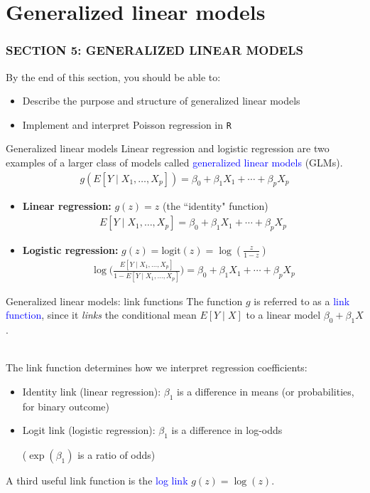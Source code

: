 \documentclass[10pt,t]{beamer}
\begin{document}
\section{Generalized linear models}
\begin{frame}
	\frametitle{SECTION 5: GENERALIZED LINEAR MODELS}
	By the end of this section, you should be able to:
	\begin{itemize}
		\item Describe the purpose and structure of generalized linear models
		\item Implement and interpret Poisson regression in \texttt{R}
	\end{itemize}
\end{frame}

\begin{frame}{Generalized linear models}
	Linear regression and logistic regression are two examples of a  larger class of models called \textcolor{blue}{generalized linear models} (GLMs).
	\begin{align*}
		g(E[Y \mid X_1,\dots, X_p]) = \beta_0 + \beta_1X_1 + \cdots + \beta_pX_p
	\end{align*}
	\begin{itemize}
		\item \textbf{Linear regression:} $g(z) = z$ (the ``identity" function)
		\begin{align*}
			E[Y \mid X_1,\dots, X_p] = \beta_0 + \beta_1X_1 + \cdots + \beta_pX_p
		\end{align*}
	
		\item \textbf{Logistic regression:} $g(z) = \text{logit}(z) = \log(\frac{z}{1-z})$
		\begin{align*}
			\log\biggr(\frac{E[Y \mid X_1,\dots, X_p]}{1 - E[Y \mid X_1,\dots, X_p]}\biggr) = \beta_0 + \beta_1X_1 + \cdots+ \beta_pX_p
		\end{align*}
	\end{itemize}
\end{frame}

\begin{frame}{Generalized linear models: link functions}
	The function $g$ is referred to as a \textcolor{blue}{link function}, since it \textit{links} the conditional mean $E[Y \mid X]$ to a linear model $\beta_0 + \beta_1X$. 
	\\ ~\
	
	The link function determines how we interpret regression coefficients: 
	\begin{itemize}
		\item Identity link (linear regression): $\beta_1$ is a difference in means (or probabilities, for binary outcome)
		\item Logit link (logistic regression): $\beta_1$ is a difference in log-odds \begin{footnotesize}($\exp(\beta_1)$ is a ratio of odds)\end{footnotesize}
	\end{itemize}
	A third useful link function is the \textcolor{blue}{log link} $g(z) = \log(z)$. 
\end{frame}
\end{document}
